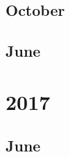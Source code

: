 \documentclass[12pt]{article}
\begin{document}
\subsection{October}
\begin{refsection}
    \nocite{devlin2019bertpretrainingdeepbidirectional}
    \printbibliography[heading=none]
\end{refsection}


\subsection{June}
\begin{refsection}
    \nocite{radford_improving_nodate}
    \printbibliography[heading=none]
\end{refsection}


\newpage
\section{2017}
\subsection{June}
\begin{refsection}
    \nocite{vaswani2023attentionneed}
    \printbibliography[heading=none]
\end{refsection}
\end{document}
